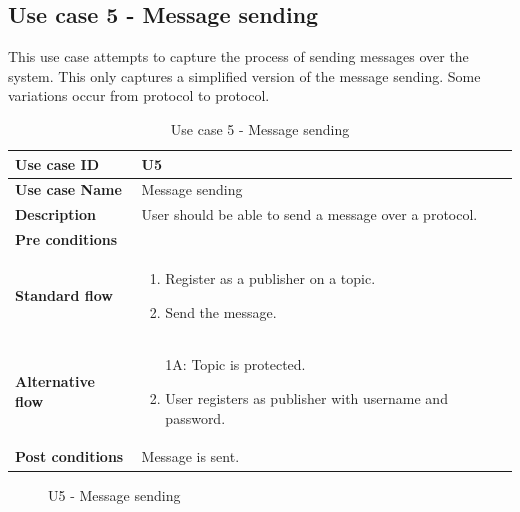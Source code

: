 \subsection{Use case 5 - Message sending}

This use case attempts to capture the process of sending messages over the system. This only captures a simplified version of the message sending. Some variations occur from protocol to protocol.

\begin{table}[ht!]
\centering
\begin{tabular}{|l|p{5cm}|}
\hline
\textbf{Use case ID} & U5 \\ \hline
\textbf{Use case Name} & Message sending \\ \hline
\textbf{Description} & User should be able to send a message over a protocol.  \\ \hline
\textbf{Pre conditions} &  \\ \hline
\textbf{Standard flow} & \begin{enumerate}
\item Register as a publisher on a topic.
\item Send the message.
\end{enumerate} \\ \hline
\textbf{Alternative flow} & \begin{enumerate}
\item [1A:] Topic is protected.
\item User registers as publisher with username and password.
\end{enumerate} \\ \hline
\textbf{Post conditions} & Message is sent.  \\ \hline
\end{tabular}
\caption{Use case 5 - Message sending}
\label{uc5}
\end{table}

\begin{center}
  \begin{figure}[ht!]
    \caption{U5 - Message sending}
    \label{fig:u5}
  \end{figure}
\end{center}

